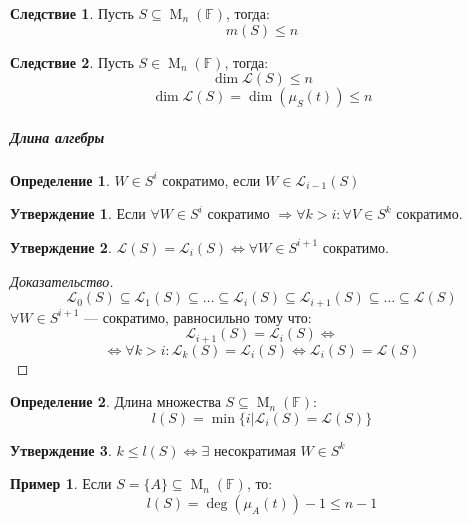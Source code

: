 \documentclass[a4paper, 14pt]{extarticle}
\theoremstyle{definition}
\newtheorem{definition}{Определение}
\newtheorem{conseq}{Следствие}
\newtheorem{example}{Пример}
\newtheorem{state}{Утверждение}
\begin{document}
\begin{conseq}
	Пусть \(S \subseteq \operatorname{M}_n(\mathbb{F})\), тогда:
	\[m(S) \leqslant n\]
\end{conseq}

\begin{conseq}
	Пусть \(S \in \operatorname{M}_n(\mathbb{F})\), тогда:
	\[\operatorname{dim} \mathcal{L}(S) \leqslant n\]
	\[\operatorname{dim} \mathcal{L}(S) = \operatorname{dim}(\mu_S(t)) \leqslant n\]
\end{conseq}

\subparagraph{Длина алгебры}

\begin{definition}
	\(W \in S^{i}\) сократимо, если \(W \in \mathcal{L}_{i - 1}(S)\)
\end{definition}

\begin{state}
	Если \(\forall W \in S^i\) сократимо \(\Rightarrow \forall k > i: \forall V \in S^k\) сократимо.
\end{state}

\begin{state}
	\(\mathcal{L}(S) = \mathcal{L}_i(S) \Leftrightarrow \forall W \in S^{i + 1}\) сократимо.
\end{state}

\begin{proof}[Доказательство]
	\[\mathcal{L}_0(S) \subseteq \mathcal{L}_1(S) \subseteq \dots \subseteq \mathcal{L}_i(S) \subseteq \mathcal{L}_{i + 1}(S) \subseteq \dots \subseteq \mathcal{L}(S)\]
	\(\forall W \in S^{i + 1}\) --- сократимо, равносильно тому что:
	\[\mathcal{L}_{i + 1}(S) = \mathcal{L}_i(S) \Leftrightarrow\]
	\[\Leftrightarrow \forall k > i : \mathcal{L}_k(S) = \mathcal{L}_i(S) \Leftrightarrow \mathcal{L}_i(S) = \mathcal{L}(S)\]
\end{proof}

\begin{definition}
	Длина множества \(S \subseteq \operatorname{M}_n(\mathbb{F})\):
	\[l(S) = \operatorname{min}\{i | \mathcal{L}_i(S) = \mathcal{L}(S)\}\]
\end{definition}

\begin{state}
	\(k \leqslant l(S) \Leftrightarrow \exists\) несократимая \(W \in S^k\)
\end{state}

\begin{example}
	Если \(S = \{A\} \subseteq \operatorname{M}_n(\mathbb{F})\), то:
	\[l(S) = \operatorname{deg}(\mu_A(t)) - 1 \leqslant n - 1\]
\end{example}
\end{document}
